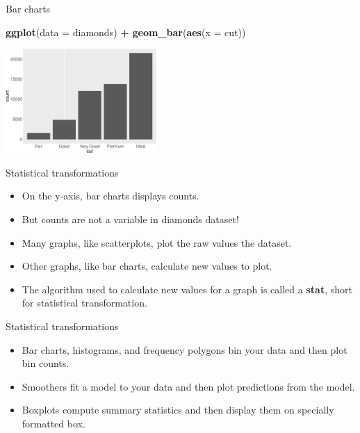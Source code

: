 \documentclass[ignorenonframetext,]{beamer}
\newenvironment{Shaded}{\begin{snugshade}}{\end{snugshade}}
\newcommand{\DataTypeTok}[1]{\textcolor[rgb]{0.13,0.29,0.53}{#1}}
\newcommand{\KeywordTok}[1]{\textcolor[rgb]{0.13,0.29,0.53}{\textbf{#1}}}
\newcommand{\NormalTok}[1]{#1}
\newcommand{\OperatorTok}[1]{\textcolor[rgb]{0.81,0.36,0.00}{\textbf{#1}}}
\newcommand{\StringTok}[1]{\textcolor[rgb]{0.31,0.60,0.02}{#1}}
\begin{document}
\begin{frame}[fragile]{Bar charts}
\protect\hypertarget{bar-charts}{}

\begin{Shaded}
\begin{Highlighting}[]
\KeywordTok{ggplot}\NormalTok{(}\DataTypeTok{data =}\NormalTok{ diamonds) }\OperatorTok{+}\StringTok{ }
\StringTok{  }\KeywordTok{geom_bar}\NormalTok{(}\KeywordTok{aes}\NormalTok{(}\DataTypeTok{x =}\NormalTok{ cut))}
\end{Highlighting}
\end{Shaded}

\begin{center}\includegraphics[height=150px]{data-visualization_files/figure-beamer/unnamed-chunk-112-1} \end{center}

\end{frame}

\begin{frame}{Statistical transformations}
\protect\hypertarget{statistical-transformations}{}

\begin{itemize}
\item
  On the y-axis, bar charts displays counts.
\item
  But counts are not a variable in diamonds dataset!
\item
  Many graphs, like scatterplots, plot the raw values the dataset.
\item
  Other graphs, like bar charts, calculate new values to plot.
\item
  The algorithm used to calculate new values for a graph is called a
  \textbf{stat}, short for statistical transformation.
\end{itemize}

\end{frame}

\begin{frame}{Statistical transformations}
\protect\hypertarget{statistical-transformations-1}{}

\begin{itemize}
\item
  Bar charts, histograms, and frequency polygons bin your data and then
  plot bin counts.
\item
  Smoothers fit a model to your data and then plot predictions from the
  model.
\item
  Boxplots compute summary statistics and then display them on specially
  formatted box.
\end{itemize}

\end{frame}
\end{document}

